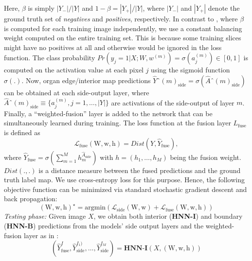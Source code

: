 \documentclass[journal]{IEEEtran}
\begin{document}
Here, $\beta$ is simply $|Y_-|/|Y|$ and $1-\beta = |Y_+|/|Y|$, where $|Y_-|$ and $|Y_+|$ denote the ground truth set of \textit{negatives} and \textit{positives}, respectively. In contrast to \cite{xie2015holistically}, where $\beta$ is computed for each training image independently, we use a constant balancing weight computed on the entire training set. This is because some training slices might have no positives at all and otherwise would be ignored in the loss function. The class probability $Pr(y_j=1|X;W,w^{(m)}) = \sigma(a_j^{(m)}) \in [0,1]$ is computed on the activation value at each pixel $j$ using the sigmoid function $\sigma(.)$. Now, organ edge/interior map predictions $\hat{Y}ˆ{(m)}_\mathrm{side} = \sigma(\hat{A}ˆ{(m)}_\mathrm{side})$ can be obtained at each side-output layer, where $\hat{A}ˆ{(m)}_\mathrm{side} \equiv\{a_j^{(m)}, j = 1,\dots,|Y|\}$ are activations of the side-output of layer $m$. Finally, a ``weighted-fusion'' layer is added to the network that can be simultaneously learned during training. The loss function at the fusion layer $L_\mathrm{fuse}$ is defined as
\begin{equation}
	\mathcal{L}_\mathrm{fuse}(\bm{\mathrm{W}}, \bm{\mathrm{w}}, \bm{\mathrm{h}}) = Dist\left(Y, \hat{Y}_\mathrm{fuse}\right), 
\end{equation}
where $\hat{Y}_\mathrm{fuse} = \sigma \left(\sum^M_{m=1} h_m^{\hat{A}_\mathrm{side}}   \right)$ with $h = \left(h_1,\dots,h_M\right)$ being the fusion weight. $Dist(.,.)$ is a distance measure between the fused predictions and the ground truth label map. We use cross-entropy loss for this purpose. Hence, the following objective function can be minimized via standard stochastic gradient descent and back propagation:
\begin{equation}
	(\bm{\mathrm{W}}, \bm{\mathrm{w}}, \bm{\mathrm{h}})^\star = \mathrm{argmin}\left(\mathcal{L}_\mathrm{side}(\bm{\mathrm{W}}, \bm{\mathrm{w}}) + \mathcal{L}_\mathrm{fuse}(\bm{\mathrm{W}}, \bm{\mathrm{w}}, \bm{\mathrm{h}})\right)
\end{equation}
\textit{Testing phase:} Given image $X$, we obtain both interior (\textbf{HNN-I}) and boundary (\textbf{HNN-B}) predictions from the models' side output layers and the weighted-fusion layer as in \cite{xie2015holistically}:
\begin{equation}
	\left(\hat{Y}^{I}_\mathrm{fuse}, \hat{Y}_\mathrm{side}^{I_1)}, \dots, \hat{Y}_\mathrm{side}^{I_M}\right) =  \textbf{HNN-I}\left(X, (\bm{\mathrm{W}}, \bm{\mathrm{w}}, \bm{\mathrm{h}}) \right)
\end{equation}
\end{document}

